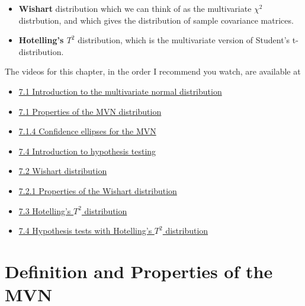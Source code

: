 \documentclass[]{book}
\providecommand{\tightlist}{%
  \setlength{\itemsep}{0pt}\setlength{\parskip}{0pt}}
\theoremstyle{definition}
\theoremstyle{definition}
\theoremstyle{definition}
\theoremstyle{remark}
\begin{document}
\begin{itemize}
\item
  \textbf{Wishart} distribution which we can think of as the multivariate \(\chi^2\) distrbution, and which gives the distribution of sample covariance matrices.
\item
  \textbf{Hotelling's \(T^2\)} distribution, which is the multivariate version of Student's t-distribution.
\end{itemize}

The videos for this chapter, in the order I recommend you watch, are available at

\begin{itemize}
\tightlist
\item
  \href{https://mediaspace.nottingham.ac.uk/media/Multivariate+Normal+Random+VariablesA+Introduction/1_pdjxphay}{7.1 Introduction to the multivariate normal distribution}
\item
  \href{https://mediaspace.nottingham.ac.uk/media/Multivariate+Normal+Random+VariablesA++Properties/1_j9mh4v7r}{7.1 Properties of the MVN distribution}
\item
  \href{https://mediaspace.nottingham.ac.uk/media/Multivariate+Normal+Random+VariablesA++Confidence+Ellipses/1_dlvgqoi3}{7.1.4 Confidence ellipses for the MVN}
\item
  \href{https://mediaspace.nottingham.ac.uk/media/MVN_HypothesistestIntro.mp4/1_b1gstf1h}{7.4 Introduction to hypothesis testing}
\item
  \href{https://mediaspace.nottingham.ac.uk/media/MVN_Wishart/1_3kpedgb6}{7.2 Wishart distribution}
\item
  \href{https://mediaspace.nottingham.ac.uk/media/MVN_WishartProperties/1_yfgzcsyb}{7.2.1 Properties of the Wishart distribution}
\item
  \href{https://mediaspace.nottingham.ac.uk/media/MVN_Hotelling.mp4/1_5evjeyu8}{7.3 Hotelling's \(T^2\) distribution}
\item
  \href{https://mediaspace.nottingham.ac.uk/media/Multivariate+NormalsA+Hypothesis+testing/1_bhk20k5z}{7.4 Hypothesis tests with Hotelling's \(T^2\) distribution}
\end{itemize}

\hypertarget{definition-and-properties-of-the-mvn}{%
\section{Definition and Properties of the MVN}\label{definition-and-properties-of-the-mvn}}
\end{document}
